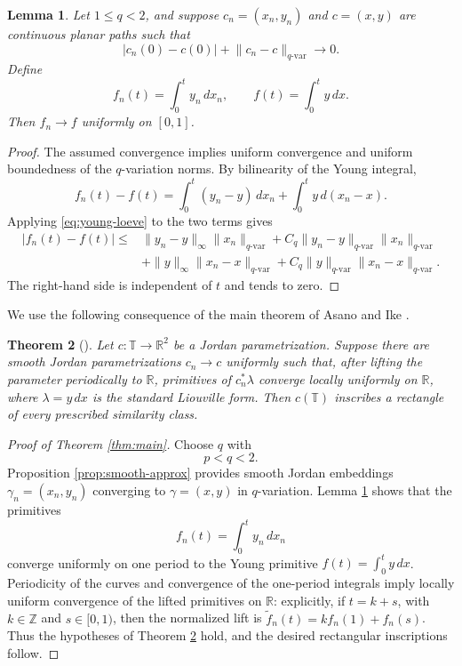 \documentclass[11pt,reqno]{amsart}
\newtheorem{theorem}{Theorem}[section]
\newtheorem{lemma}[theorem]{Lemma}
\theoremstyle{definition}
\theoremstyle{remark}
\newcommand{\R}{\mathbb{R}}
\newcommand{\T}{\mathbb{T}}
\begin{document}
\begin{lemma}\label{lem:young-stability}
Let \(1\leq q<2\), and suppose
\(c_n=(x_n,y_n)\) and \(c=(x,y)\) are continuous planar paths such that
\[
 |c_n(0)-c(0)|+
 \lVert c_n-c\rVert_{q\text{-var}}\longrightarrow0.
\]
Define
\[
 f_n(t)=\int_0^t y_n\,dx_n,
 \qquad
 f(t)=\int_0^t y\,dx.
\]
Then \(f_n\to f\) uniformly on \([0,1]\).
\end{lemma}

\begin{proof}
The assumed convergence implies uniform convergence and uniform boundedness
of the \(q\)-variation norms.  By bilinearity of the Young integral,
\[
 f_n(t)-f(t)
 =\int_0^t(y_n-y)\,dx_n
  +\int_0^t y\,d(x_n-x).
\]
Applying \eqref{eq:young-loeve} to the two terms gives
\[
\begin{aligned}
 |f_n(t)-f(t)|
 \leq{}&
 \lVert y_n-y\rVert_\infty
 \lVert x_n\rVert_{q\text{-var}}
 +C_q\lVert y_n-y\rVert_{q\text{-var}}
       \lVert x_n\rVert_{q\text{-var}}\\
 &+\lVert y\rVert_\infty
 \lVert x_n-x\rVert_{q\text{-var}}
 +C_q\lVert y\rVert_{q\text{-var}}
       \lVert x_n-x\rVert_{q\text{-var}}.
\end{aligned}
\]
The right-hand side is independent of \(t\) and tends to zero.
\end{proof}

We use the following consequence of the main theorem of Asano and Ike
\cite{AsanoIke}.

\begin{theorem}[{\cite[Theorem~1.1]{AsanoIke}}]\label{thm:AI}
Let \(c\colon\T\to\R^2\) be a Jordan parametrization.  Suppose there are
smooth Jordan parametrizations \(c_n\to c\) uniformly such that, after lifting
the parameter periodically to \(\R\), primitives of \(c_n^*\lambda\) converge
locally uniformly on \(\R\), where \(\lambda=y\,dx\) is the standard
Liouville form.  Then \(c(\T)\) inscribes a rectangle of every prescribed
similarity class.
\end{theorem}

\begin{proof}[Proof of Theorem \ref{thm:main}]
Choose \(q\) with
\[
 p<q<2.
\]
Proposition \ref{prop:smooth-approx} provides smooth Jordan embeddings
\(\gamma_n=(x_n,y_n)\) converging to
\(\gamma=(x,y)\) in \(q\)-variation.  Lemma \ref{lem:young-stability} shows
that the primitives
\[
 f_n(t)=\int_0^t y_n\,dx_n
\]
converge uniformly on one period to the Young primitive
\(f(t)=\int_0^t y\,dx\).  Periodicity of the curves and convergence of the
one-period integrals imply locally uniform convergence of the lifted
primitives on \(\R\): explicitly, if \(t=k+s\), with \(k\in\mathbb Z\) and
\(s\in[0,1)\), then the normalized lift is
\(\widetilde f_n(t)=k f_n(1)+f_n(s)\).  Thus the hypotheses of Theorem
\ref{thm:AI} hold, and the desired rectangular inscriptions follow.
\end{proof}
\end{document}
